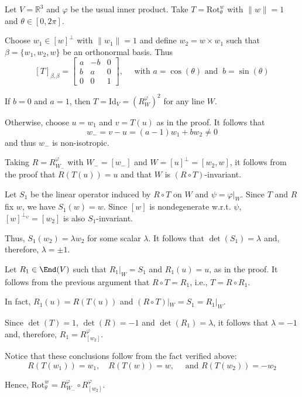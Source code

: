 \begin{example}
  Let $V = \mathbb{R}^3$ and $\varphi$ be the usual inner product. Take $T = \text{Rot}_\theta^w$ with $\| w \| = 1$ and $\theta \in [0, 2 \pi]$. 

  Choose $w_1 \in [w]^\perp$ with $\| w_1 \| = 1$ and define $w_2 = w \times w_1$ such that $\beta = \{ w_1, w_2, w \}$ be an orthonormal basis. Thus 
  \[
    [T]_{\beta, \beta} = \begin{bmatrix}
      a & -b & 0 \\
      b &  a & 0 \\
      0 &  0 & 1
    \end{bmatrix},
    \quad \text{ with } a = \cos(\theta) \text{ and } ~b = \sin(\theta)
  \]

  If $b = 0$ and $a = 1$, then $T = \text{Id}_V = (R_W^\varphi)^2$ for any line $W$. 

  Otherwise, choose $u = w_1$ and $v = T(u)$ as in the proof. It follows that 
  \[
    w_- = v-u = (a-1)w_1 + bw_2 \neq 0 
  \]
  and thus $w_-$ is non-isotropic. 

  Taking $R = R_{W_-}^\varphi$ with $W_- = [w_-]$ and $W = [u]^\perp = [w_2, w]$, it follows from the proof that $R(T(u)) = u$ and that $W$ is $(R \circ T)$-invariant. 

  Let $S_1$ be the linear operator induced by $R \circ T$ on $W$  and $\psi = \varphi|_W$. Since $T$ and $R$ fix $w$, we have $S_1(w) = w$. Since $[w]$ is nondegenerate w.r.t. $\psi$, $[w]^{\perp_\psi} = [w_2]$ is also $S_1$-invariant. 

  Thus, $S_1(w_2) = \lambda w_2$ for some scalar $\lambda$. It follows that $\det(S_1) = \lambda$ and, therefore, $\lambda = \pm 1$. 

  Let $R_1 \in \End(V)$ such that $R_1|_W = S_1$ and $R_1(u) = u$, as in the proof. It follows from the previous argument that $R \circ T = R_1$, i.e., $T = R \circ R_1$. 

  In fact, $R_1(u) = R(T(u))$ and $(R \circ T)|_W = S_1 = R_1|_W$. 

  Since $\det(T) = 1$, $\det(R) = -1$ and $\det(R_1) = \lambda$, it follows that $\lambda = -1$ and, therefore, $R_1 = R_{[w_2]}^\varphi$. 

  Notice that these conclusions follow from the fact verified above:
  \[
    R(T(w_1)) = w_1, \quad R(T(w)) = w, \quad \text{ and } R(T(w_2)) = -w_2
  \]

  Hence, $\text{Rot}_\theta^w = R_{W_-}^\varphi \circ R_{[w_2]}^\varphi$. 
\end{example}

